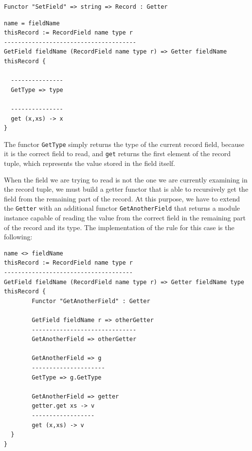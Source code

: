 \begin{lstlisting}
Functor "SetField" => string => Record : Getter
\end{lstlisting}

\begin{lstlisting}[caption = Getting a field (case 1),label = lst:ch_functors_getter1]
name = fieldName
thisRecord := RecordField name type r
--------------------------------------
GetField fieldName (RecordField name type r) => Getter fieldName thisRecord {
  
  ---------------
  GetType => type
  
  ---------------
  get (x,xs) -> x
}
\end{lstlisting}

\noindent
The functor \texttt{GetType} simply returns the type of the current record field, because it is the correct field to read, and \texttt{get} returns the first element of the record tuple, which represents the value stored in the field itself.

When the field we are trying to read is not the one we are currently examining in the record tuple, we must build a getter functor that is able to recursively get the field from the remaining part of the record. At this purpose, we have to extend the \texttt{Getter} with an additional functor \texttt{GetAnotherField} that returns a module instance capable of reading the value from the correct field in the remaining part of the record and its type. The implementation of the rule for this case is the following:

\begin{lstlisting}[caption = Getting a field (case 2),label = lst:ch_functors_getter2]
name <> fieldName
thisRecord := RecordField name type r
-------------------------------------
GetField fieldName (RecordField name type r) => Getter fieldName type thisRecord {
		Functor "GetAnotherField" : Getter
		
		GetField fieldName r => otherGetter
		------------------------------
		GetAnotherField => otherGetter
		
		GetAnotherField => g
		---------------------
		GetType => g.GetType
		
		GetAnotherField => getter
		getter.get xs -> v
		------------------
		get (x,xs) -> v
  }
}
\end{lstlisting}


